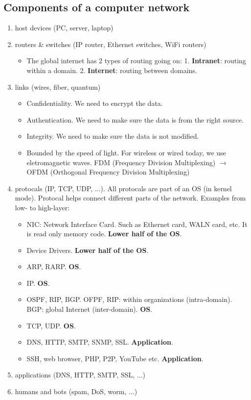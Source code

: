 \documentclass{../../ainote}
\begin{document}
\subsection{Components of a computer network}
\begin{enumerate}
    \item host devices (PC, server, laptop)
    \item routers \& switches (IP router, Ethernet switches, WiFi routers)
        \begin{itemize}
            \item The global internet has 2 types of routing going on: 1. \textbf{Intranet}: routing within a domain. 2. \textbf{Internet}: routing between domains.
        \end{itemize}
    \item links (wires, fiber, quantum)
        \begin{itemize}
            \item Confidentiality. We need to encrypt the data.
            \item Authentication. We need to make sure the data is from the right source.
            \item Integrity. We need to make sure the data is not modified.
            \item Bounded by the speed of light. For wireless or wired today, we use eletromagnetic waves.
            FDM (Frequency Division Multiplexing) $\rightarrow$ OFDM (Orthogonal Frequency Division Multiplexing)
        \end{itemize}
    \item protocals (IP, TCP, UDP, ...). All protocals are part of an OS (in kernel mode). Protocal helps connect different parts of the network. Examples from low- to high-layer:
        \begin{itemize}
            \item NIC: Network Interface Card. Such as Ethernet card, WALN card, etc. It is read only memory code. \textbf{Lower half of the OS}.
            \item Device Drivers. \textbf{Lower half of the OS}.
            \item ARP, RARP. \textbf{OS}.
            \item IP. \textbf{OS}.
            \item OSPF, RIP, BGP. OFPF, RIP: within organizations (intra-domain). BGP: global Internet (inter-domain). \textbf{OS}.
            \item TCP, UDP. \textbf{OS}.
            \item DNS, HTTP, SMTP, SNMP, SSL. \textbf{Application}.
            \item SSH, web browser, PHP, P2P, YouTube etc. \textbf{Application}.
        \end{itemize}
    \item applications (DNS, HTTP, SMTP, SSL, ...)
    \item humans and bots (spam, DoS, worm, ...)
\end{enumerate}
\end{document}
